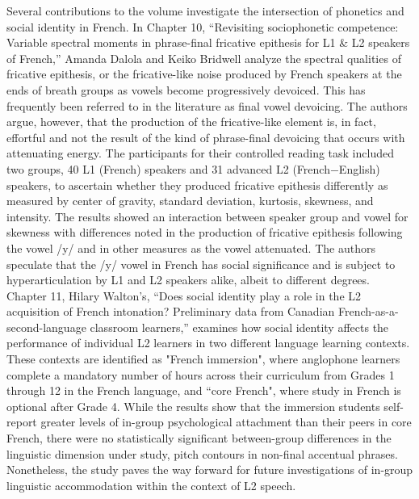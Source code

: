 \documentclass[output=paper,draftmode]{langscibook}
\begin{document}
Several contributions to the volume investigate the intersection of phonetics and social identity in French. In Chapter 10, “Revisiting sociophonetic competence: Variable spectral moments in phrase-final fricative epithesis for L1 \& L2 speakers of French,” Amanda Dalola and Keiko Bridwell analyze the spectral qualities of fricative epithesis, or the fricative-like noise produced by French speakers at the ends of breath groups as vowels become progressively devoiced. This has frequently been referred to in the literature as final vowel devoicing. The authors argue, however, that the production of the fricative-like element is, in fact, effortful and not the result of the kind of phrase-final devoicing that occurs with attenuating energy. The participants for their controlled reading task included two groups, 40 L1 (French) speakers and 31 advanced L2 (French$-$English) speakers, to ascertain whether they produced fricative epithesis differently as measured by center of gravity, standard deviation, kurtosis, skewness, and intensity. The results showed an interaction between speaker group and vowel for skewness with differences noted in the production of fricative epithesis following the vowel /y/ and in other measures as the vowel attenuated. The authors speculate that the /y/ vowel in French has social significance and is subject to hyperarticulation by L1 and L2 speakers alike, albeit to different degrees. Chapter 11, Hilary Walton’s, “Does social identity play a role in the L2 acquisition of French intonation? Preliminary data from Canadian French-as-a-second-language classroom learners,” examines how social identity affects the performance of individual L2 learners in two different language learning contexts. These contexts are identified as "French immersion", where anglophone learners complete a mandatory number of hours across their curriculum from Grades 1 through 12 in the French language, and “core French", where study in French is optional after Grade 4. While the results show that the immersion students self-report greater levels of in-group psychological attachment than their peers in core French, there were no statistically significant between-group differences in the linguistic dimension under study, pitch contours in non-final accentual phrases. Nonetheless, the study paves the way forward for future investigations of in-group linguistic accommodation within the context of L2 speech.
\end{document}

